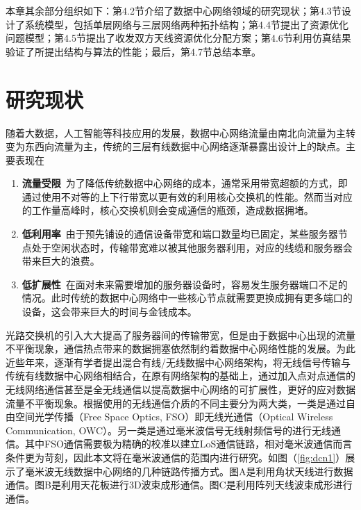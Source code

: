 本章其余部分组织如下：第4.2节介绍了数据中心网络领域的研究现状；第4.3节设计了系统模型，包括单层网络与三层网络两种拓扑结构；第4.4节提出了资源优化问题模型；第4.5节提出了收发双方天线资源优化分配方案；第4.6节利用仿真结果验证了所提出结构与算法的性能；最后，第4.7节总结本章。

\section{研究现状}

随着大数据，人工智能等科技应用的发展，数据中心网络流量由南北向流量为主转变为东西向流量为主，传统的三层有线数据中心网络逐渐暴露出设计上的缺点。主要表现在
\begin{enumerate}
	\item \textbf{流量受限}~为了降低传统数据中心网络的成本，通常采用带宽超额的方式，即通过使用不对等的上下行带宽以更有效的利用核心交换机的性能。然而当对应的工作量高峰时，核心交换机则会变成通信的瓶颈，造成数据拥堵。
	\item \textbf{低利用率}~由于预先铺设的通信设备带宽和端口数量均已固定，某些服务器节点处于空闲状态时，传输带宽难以被其他服务器利用，对应的线缆和服务器会带来巨大的浪费。
	\item \textbf{低扩展性}~在面对未来需要增加的服务器设备时，容易发生服务器端口不足的情况。此时传统的数据中心网络中一些核心节点就需要更换成拥有更多端口的设备，这会带来巨大的时间与金钱成本。
\end{enumerate}

光路交换机的引入大大提高了服务器间的传输带宽，但是由于数据中心出现的流量不平衡现象，通信热点带来的数据拥塞依然制约着数据中心网络性能的发展。为此近些年来，逐渐有学者提出混合有线/无线数据中心网络架构，将无线信号传输与传统有线数据中心网络相结合，在原有网络架构的基础上，通过加入点对点通信的无线网络通信甚至是全无线通信以提高数据中心网络的可扩展性，更好的应对数据流量不平衡现象。根据使用的无线通信介质的不同主要分为两大类\cite{hamza2016wireless}，一类是通过自由空间光学传播（Free Space Optics, FSO）即无线光通信（Optical Wireless Communication, OWC）。另一类是通过毫米波信号无线射频信号的进行无线通信。其中FSO通信需要极为精确的校准以建立LoS通信链路，相对毫米波通信而言条件更为苛刻，因此本文将在毫米波通信的范围内进行研究。如图（\ref{fig:dcn1}）展示了毫米波无线数据中心网络的几种链路传播方式。图A是利用角状天线进行数据通信。图B是利用天花板进行3D波束成形通信。图C是利用阵列天线波束成形进行通信。


